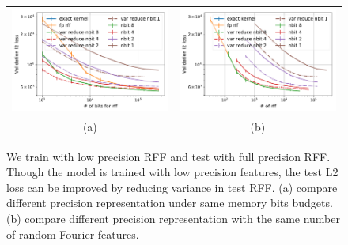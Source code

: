 \begin{figure}
	\centering
	\begin{tabular}{c c}
		\includegraphics[width=.45\linewidth]{figures/valid_l2_var_reduction.pdf} &
		\includegraphics[width=.45\linewidth]{figures/valid_l2_n_fp_var_reduction.pdf} \\
		(a) & (b)
	\end{tabular}
	\caption{We train with low precision RFF and test with full precision RFF. Though the model is trained with low precision features, the test L2 loss can be improved by reducing variance in test RFF. (a) compare different precision representation under same memory bits budgets. (b) compare different precision representation with the same number of random Fourier features. }
	\label{fig:var_reduction}
\end{figure}

%

